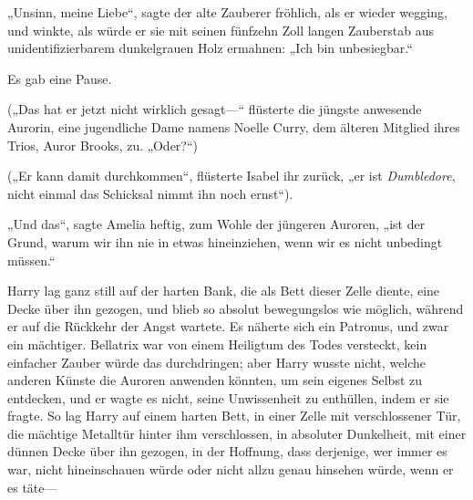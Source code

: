 „Unsinn, meine Liebe“, sagte der alte Zauberer fröhlich, als er wieder wegging, und winkte, als würde er sie mit seinen fünfzehn Zoll langen Zauberstab aus unidentifizierbarem dunkelgrauen Holz ermahnen: „Ich bin unbesiegbar.“

Es gab eine Pause.

(„Das hat er jetzt nicht wirklich gesagt—“ flüsterte die jüngste anwesende Aurorin, eine jugendliche Dame namens Noelle Curry, dem älteren Mitglied ihres Trios, Auror Brooks, zu. „Oder?“)

(„Er kann damit durchkommen“, flüsterte Isabel ihr zurück, „er ist \emph{Dumbledore}, nicht einmal das Schicksal nimmt ihn noch ernst“).

„Und das“, sagte Amelia heftig, zum Wohle der jüngeren Auroren, „ist der Grund, warum wir ihn nie in etwas hineinziehen, wenn wir es nicht unbedingt müssen.“

\later

Harry lag ganz still auf der harten Bank, die als Bett dieser Zelle diente, eine Decke über ihn gezogen, und blieb so absolut bewegungslos wie möglich, während er auf die Rückkehr der Angst wartete. Es näherte sich ein Patronus, und zwar ein mächtiger. Bellatrix war von einem Heiligtum des Todes versteckt, kein einfacher Zauber würde das durchdringen; aber Harry wusste nicht, welche anderen Künste die Auroren anwenden könnten, um sein eigenes Selbst zu entdecken, und er wagte es nicht, seine Unwissenheit zu enthüllen, indem er sie fragte. So lag Harry auf einem harten Bett, in einer Zelle mit verschlossener Tür, die mächtige Metalltür hinter ihm verschlossen, in absoluter Dunkelheit, mit einer dünnen Decke über ihn gezogen, in der Hoffnung, dass derjenige, wer immer es war, nicht hineinschauen würde oder nicht allzu genau hinsehen würde, wenn er es täte—

